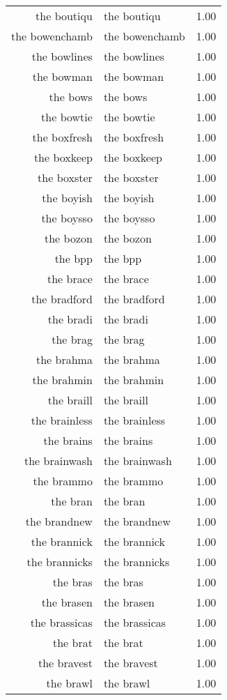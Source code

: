 \begin{table}[ht]
\begin{tabular}{rlr}
  the boutiqu & the boutiqu & 1.00 \\ 
  the bowenchamb & the bowenchamb & 1.00 \\ 
  the bowlines & the bowlines & 1.00 \\ 
  the bowman & the bowman & 1.00 \\ 
  the bows & the bows & 1.00 \\ 
  the bowtie & the bowtie & 1.00 \\ 
  the boxfresh & the boxfresh & 1.00 \\ 
  the boxkeep & the boxkeep & 1.00 \\ 
  the boxster & the boxster & 1.00 \\ 
  the boyish & the boyish & 1.00 \\ 
  the boysso & the boysso & 1.00 \\ 
  the bozon & the bozon & 1.00 \\ 
  the bpp & the bpp & 1.00 \\ 
  the brace & the brace & 1.00 \\ 
  the bradford & the bradford & 1.00 \\ 
  the bradi & the bradi & 1.00 \\ 
  the brag & the brag & 1.00 \\ 
  the brahma & the brahma & 1.00 \\ 
  the brahmin & the brahmin & 1.00 \\ 
  the braill & the braill & 1.00 \\ 
  the brainless & the brainless & 1.00 \\ 
  the brains & the brains & 1.00 \\ 
  the brainwash & the brainwash & 1.00 \\ 
  the brammo & the brammo & 1.00 \\ 
  the bran & the bran & 1.00 \\ 
  the brandnew & the brandnew & 1.00 \\ 
  the brannick & the brannick & 1.00 \\ 
  the brannicks & the brannicks & 1.00 \\ 
  the bras & the bras & 1.00 \\ 
  the brasen & the brasen & 1.00 \\ 
  the brassicas & the brassicas & 1.00 \\ 
  the brat & the brat & 1.00 \\ 
  the bravest & the bravest & 1.00 \\ 
  the brawl & the brawl & 1.00 \\ 

\end{tabular}
\end{table}
